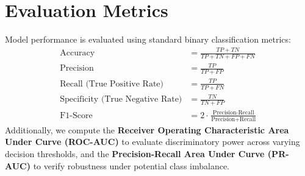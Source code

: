 \documentclass[12pt,a4paper,oneside]{report}
\begin{document}
\section{Evaluation Metrics}
Model performance is evaluated using standard binary classification metrics:
\begin{align*}
    \text{Accuracy} &= \frac{TP + TN}{TP + TN + FP + FN} \\[4pt]
    \text{Precision} &= \frac{TP}{TP + FP} \\[4pt]
    \text{Recall (True Positive Rate)} &= \frac{TP}{TP + FN} \\[4pt]
    \text{Specificity (True Negative Rate)} &= \frac{TN}{TN + FP} \\[4pt]
    \text{F1-Score} &= 2 \cdot \frac{\text{Precision} \cdot \text{Recall}}{\text{Precision} + \text{Recall}}
\end{align*}
Additionally, we compute the \textbf{Receiver Operating Characteristic Area Under Curve (ROC-AUC)} to evaluate discriminatory power across varying decision thresholds, and the \textbf{Precision-Recall Area Under Curve (PR-AUC)} to verify robustness under potential class imbalance.
\end{document}
